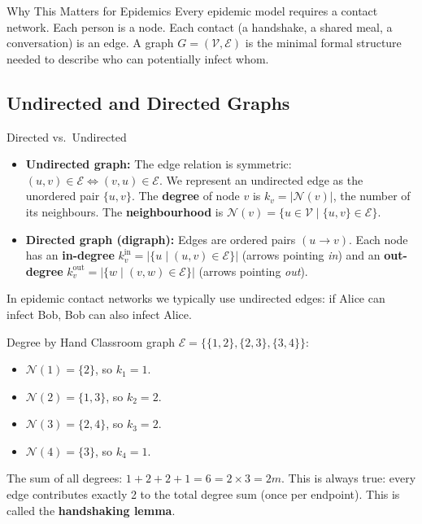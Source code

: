 \begin{keyinsight}{Why This Matters for Epidemics}
Every epidemic model requires a contact network. Each person is a node. Each contact (a handshake, a shared meal, a conversation) is an edge. A graph $G = (\mathcal{V}, \mathcal{E})$ is the minimal formal structure needed to describe who can potentially infect whom.
\end{keyinsight}

\subsection{Undirected and Directed Graphs}

\begin{conceptbox}{Directed vs.\ Undirected}
\begin{itemize}[noitemsep]
    \item \textbf{Undirected graph:} The edge relation is symmetric: $(u,v) \in \mathcal{E} \iff (v,u) \in \mathcal{E}$. We represent an undirected edge as the unordered pair $\{u,v\}$. The \textbf{degree} of node $v$ is $k_v = |\mathcal{N}(v)|$, the number of its neighbours. The \textbf{neighbourhood} is $\mathcal{N}(v) = \{u \in \mathcal{V} \mid \{u,v\} \in \mathcal{E}\}$.
    \item \textbf{Directed graph (digraph):} Edges are ordered pairs $(u \to v)$. Each node has an \textbf{in-degree} $k_v^{\mathrm{in}} = |\{u \mid (u,v) \in \mathcal{E}\}|$ (arrows pointing \emph{in}) and an \textbf{out-degree} $k_v^{\mathrm{out}} = |\{w \mid (v,w) \in \mathcal{E}\}|$ (arrows pointing \emph{out}).
\end{itemize}
In epidemic contact networks we typically use undirected edges: if Alice can infect Bob, Bob can also infect Alice.
\end{conceptbox}

\begin{examplebox}{Degree by Hand}
Classroom graph $\mathcal{E} = \{\{1,2\}, \{2,3\}, \{3,4\}\}$:
\begin{itemize}[noitemsep]
    \item $\mathcal{N}(1) = \{2\}$, so $k_1 = 1$.
    \item $\mathcal{N}(2) = \{1, 3\}$, so $k_2 = 2$.
    \item $\mathcal{N}(3) = \{2, 4\}$, so $k_3 = 2$.
    \item $\mathcal{N}(4) = \{3\}$, so $k_4 = 1$.
\end{itemize}
The sum of all degrees: $1+2+2+1=6 = 2 \times 3 = 2m$. This is always true: every edge contributes exactly 2 to the total degree sum (once per endpoint). This is called the \textbf{handshaking lemma}.
\end{examplebox}

